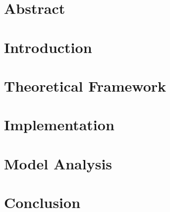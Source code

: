\documentclass[a4paper,11pt,bibliography=totoc,listof=totoc,headinclude=true,cleardoublepage=empty]{article}
\author{Simon Mitterhofer}
\numberwithin{equation}{section}
\begin{document}



\cleardoublepage




%

\newpage
\section*{Abstract}

\thispagestyle{empty}


\newpage
\tableofcontents

\newpage
{}
\setcounter{page}{1}
\section{Introduction}


\newpage
\section{Theoretical Framework}


\newpage
\section{Implementation}


\newpage
\section{Model Analysis}

\newpage


\newpage
\section{Conclusion}

\end{document}
